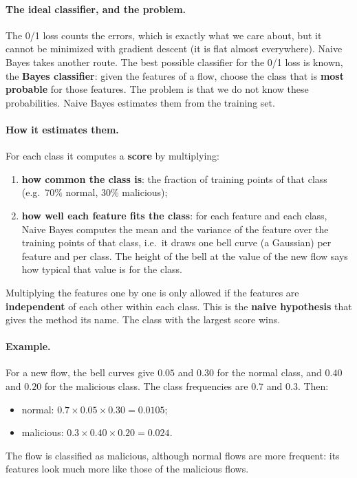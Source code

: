 \paragraph{The ideal classifier, and the problem.} The 0/1 loss counts the errors, which is exactly what we care about, but it cannot be minimized with gradient descent (it is flat almost everywhere). Naive Bayes takes another route. The best possible classifier for the 0/1 loss is known, the \textbf{Bayes classifier}: given the features of a flow, choose the class that is \textbf{most probable} for those features. The problem is that we do not know these probabilities. Naive Bayes estimates them from the training set.

\paragraph{How it estimates them.} For each class it computes a \textbf{score} by multiplying:
\begin{enumerate}
    \item \textbf{how common the class is}: the fraction of training points of that class (e.g.\ 70\% normal, 30\% malicious);
    \item \textbf{how well each feature fits the class}: for each feature and each class, Naive Bayes computes the mean and the variance of the feature over the training points of that class, i.e.\ it draws one bell curve (a Gaussian) per feature and per class. The height of the bell at the value of the new flow says how typical that value is for the class.
\end{enumerate}
Multiplying the features one by one is only allowed if the features are \textbf{independent} of each other within each class. This is the \textbf{naive hypothesis} that gives the method its name. The class with the largest score wins.

\paragraph{Example.} For a new flow, the bell curves give $0.05$ and $0.30$ for the normal class, and $0.40$ and $0.20$ for the malicious class. The class frequencies are $0.7$ and $0.3$. Then:
\begin{itemize}
    \item normal: $0.7 \times 0.05 \times 0.30 = 0.0105$;
    \item malicious: $0.3 \times 0.40 \times 0.20 = 0.024$.
\end{itemize}
The flow is classified as malicious, although normal flows are more frequent: its features look much more like those of the malicious flows.

